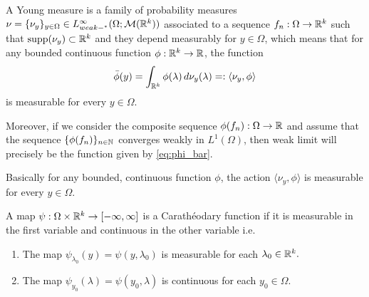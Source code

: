 \sloppy A Young measure is a family of probability measures $\nu = \{\nu_y\}_{y \in \Omega} \in L^\infty_{weak-^*}(\Omega; {\cal M}(\mathbb{R}^k))$ associated to a sequence $f_n : \Omega \to \mathbb{R}^k$ such that $\text{supp}(\nu_y) \subset \mathbb{R}^k$ and they depend measurably for $y \in \Omega$, which means that for any bounded continuous function $\phi : \mathbb{R}^k \to \mathbb{R}$, the function
\begin{equation}\label{eq:phi_bar}
    \bar{\phi}(y) = \displaystyle \int_{\mathbb{R}^k} \phi(\lambda)\, d\nu_y(\lambda) =: \langle \nu_y, \phi \rangle 
\end{equation}
is measurable for every $y \in \Omega$. 

Moreover, if we consider the composite sequence $\phi(f_n) : \Omega \to \mathbb{R}$ and assume that the sequence $\{\phi(f_n)\}_{n \in \mathbb{N}}$ converges weakly in $L^1(\Omega)$, then weak limit will precisely be the function given by \ref{eq:phi_bar}.

\begin{rem}
    Basically for any bounded, continuous function $\phi$, the action $\langle \nu_y, \phi \rangle$ is measurable for every $y \in \Omega$. 
\end{rem}

\begin{defn}
    A map $\psi : \Omega \times \mathbb{R}^k \to [-\infty, \infty]$ is a Carath\'eodary function if it is measurable in the first variable and continuous in the other variable i.e.
    \begin{enumerate}
        \item The map $\psi_{\lambda_0}(y) = \psi(y, \lambda_0)$ is measurable for each $\lambda_0 \in \mathbb{R}^k.$ 
        \item The map $\psi_{y_0}(\lambda) = \psi(y_0, \lambda)$ is continuous for each $y_0 \in \Omega.$
    \end{enumerate}
\end{defn}